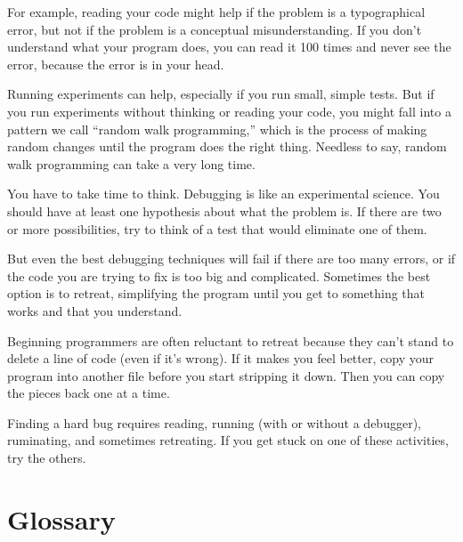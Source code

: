 For example, reading your code might help if the problem is a
typographical error, but not if the problem is a conceptual
misunderstanding.  If you don't understand what your program does, you
can read it 100 times and never see the error, because the error is in
your head.

Running experiments can help, especially if you run small, simple
tests.  But if you run experiments without thinking or reading your
code, you might fall into a pattern we call ``random walk programming,'' 
which is the process of making random changes until the program
does the right thing.  Needless to say, random walk programming
can take a very long time.

You have to take time to think.  Debugging is like an
experimental science.  You should have at least one hypothesis about
what the problem is.  If there are two or more possibilities, try to
think of a test that would eliminate one of them.

But even the best debugging techniques will fail if there are too many
errors, or if the code you are trying to fix is too big and
complicated.  Sometimes the best option is to retreat, simplifying the
program until you get to something that works and that you
understand.

Beginning programmers are often reluctant to retreat because
they can't stand to delete a line of code (even if it's wrong).
If it makes you feel better, copy your program into another file
before you start stripping it down.  Then you can copy the pieces
back one at a time.

Finding a hard bug requires reading, running (with or without 
a debugger), ruminating, and sometimes retreating.  If you get 
stuck on one of these activities, try the others.


\section{Glossary}

